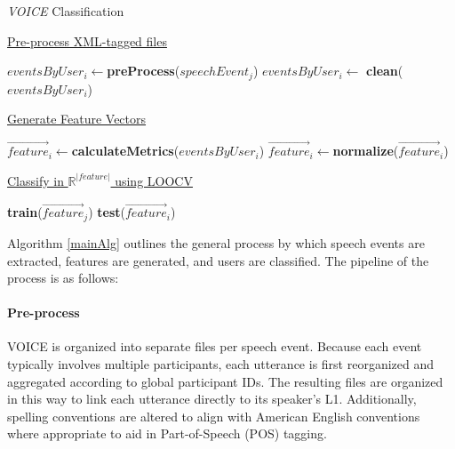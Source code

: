 \documentclass[11pt]{article}
\begin{document}
\begin{algorithm}[h]
\caption{\emph{VOICE} Classification}\label{mainAlg}
{\vspace{0.5em}\underline{Pre-process XML-tagged files}}
\begin{algorithmic}[1]\small
{}
\State $eventsByUser_i \gets $\textbf{preProcess}($speechEvent_j$)
\EndFor
{}
\State $eventsByUser_i \gets $ \textbf{clean}($eventsByUser_i$)
\EndFor
\end{algorithmic}
{\vspace{0.5em}\underline{Generate Feature Vectors}}
\begin{algorithmic}[1]\small
{}
\State $\overrightarrow{feature}_i \gets $\textbf{calculateMetrics}($eventsByUser_i$)
\State $\overrightarrow{feature}_i \gets $\textbf{normalize}($\overrightarrow{feature}_i$)
\EndFor
\end{algorithmic}
{\vspace{0.5em}\underline{Classify in $\mathbb{R}^{|feature|}$ using LOOCV}}
\begin{algorithmic}[1]\small
{}
\State \textbf{train}($\overrightarrow{feature}_j$)
\EndIf
\State \textbf{test}($\overrightarrow{feature}_i$)
\EndFor
\EndFor
\end{algorithmic}
\end{algorithm}

Algorithm \ref{mainAlg} outlines the general process by which speech events are extracted, features are generated, and users are classified. The pipeline of the process is as follows: 

\paragraph{Pre-process} VOICE is organized into separate files per speech event. Because each event typically involves multiple participants, each utterance is first reorganized and aggregated according to global participant IDs. The resulting files are organized in this way to link each utterance directly to its speaker's L1. Additionally, spelling conventions are altered to align with American English conventions where appropriate to aid in Part-of-Speech (POS) tagging.
 
\end{document}
